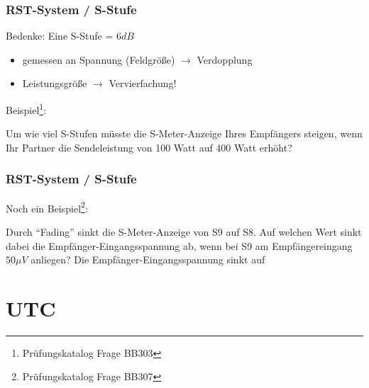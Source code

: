 \begin{frame}
    \frametitle{RST-System / S-Stufe}

    Bedenke: Eine S-Stufe = $6 dB$

    \begin{itemize}
        \item gemessen an Spannung (Feldgröße) $\rightarrow$ Verdopplung
        \item Leistungsgröße $\rightarrow$ Vervierfachung!
    \end{itemize}

    \vspace{1cm}

    Beispiel\footnote{Prüfungskatalog Frage BB303}:    

    \begin{exampleblock}{Um wie viel S-Stufen müsste die S-Meter-Anzeige Ihres
                  Empfängers steigen, wenn Ihr Partner die Sendeleistung von 100
                  Watt auf 400 Watt erhöht?}
    \end{exampleblock}

\end{frame}

\begin{frame}
    \frametitle{RST-System / S-Stufe}

    Noch ein Beispiel\footnote{Prüfungskatalog Frage BB307}:    

    \begin{exampleblock}{Durch ``Fading'' sinkt die S-Meter-Anzeige von S9 auf S8. Auf
                  welchen Wert sinkt dabei die Empfänger-Eingangsspannung ab,
                  wenn bei S9 am Empfängereingang $50\mu V$ anliegen? Die
                  Empfänger-Eingangsspannung sinkt auf}
    \end{exampleblock}

\end{frame}

\section{UTC}

